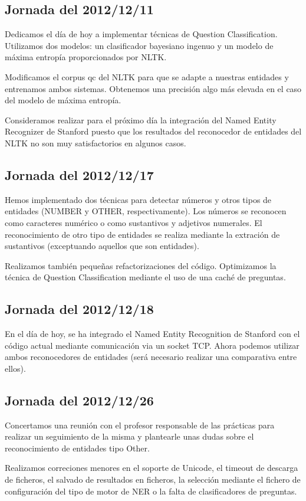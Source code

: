 \documentclass[12pt,a4paper,titlepage]{article}
\begin{document}
\subsection{Jornada del 2012/12/11}
Dedicamos el día de hoy a implementar técnicas de Question Classification. Utilizamos dos modelos: un clasificador bayesiano ingenuo y un modelo de máxima entropía proporcionados por NLTK.

Modificamos el corpus qc del NLTK para que se adapte a nuestras entidades y entrenamos ambos sistemas. Obtenemos una precisión algo más elevada en el caso del modelo de máxima entropía.

Consideramos realizar para el próximo día la integración del Named Entity Recognizer de Stanford puesto que los resultados del reconocedor de entidades del NLTK no son muy satisfactorios en algunos casos.

\subsection{Jornada del 2012/12/17}
Hemos implementado dos técnicas para detectar números y otros tipos de entidades (NUMBER y OTHER, respectivamente). Los números se reconocen como caracteres numérico o como sustantivos y adjetivos numerales. El reconocimiento de otro tipo de entidades se realiza mediante la extración de sustantivos (exceptuando aquellos que son entidades).

Realizamos también pequeñas refactorizaciones del código. Optimizamos la técnica de Question Classification mediante el uso de una caché de preguntas.

\subsection{Jornada del 2012/12/18}
En el día de hoy, se ha integrado el Named Entity Recognition de Stanford con el código actual mediante comunicación via un socket TCP. Ahora podemos utilizar ambos reconocedores de entidades (será necesario realizar una comparativa entre ellos).

\subsection{Jornada del 2012/12/26}
Concertamos una reunión con el profesor responsable de las prácticas para realizar un seguimiento de la misma y plantearle unas dudas sobre el reconocimiento de entidades tipo Other.

Realizamos correciones menores en el soporte de Unicode, el timeout de descarga de ficheros, el salvado de resultados en ficheros, la selección mediante el fichero de configuración del tipo de motor de NER o la falta de clasificadores de preguntas.
\end{document}
